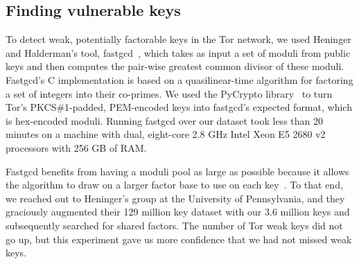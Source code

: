 \subsection{Finding vulnerable keys}
\label{sec:vulnerable-keys}
To detect weak, potentially factorable keys in the Tor network, we used Heninger
and Halderman's tool, fastgcd~\cite{fastgcd}, which takes as input a set
of moduli from public keys and then computes the pair-wise greatest common
divisor of these moduli.  Fastgcd's C implementation is based on a
quasilinear-time algorithm for factoring a set of integers into their co-primes.
We used the PyCrypto library~\cite{pycrypto} to turn Tor's PKCS\#1-padded,
PEM-encoded keys into fastgcd's expected format, which is hex-encoded
moduli.  Running fastgcd over our dataset took less than 20 minutes on
a machine with dual, eight-core 2.8 GHz Intel Xeon E5 2680 v2 processors with
256 GB of RAM.

Fastgcd benefits from having a moduli pool as large as possible
because it allows the algorithm to draw on a larger factor base to use on each
key~\cite{Heninger2012a}.  To that end, we reached out to Heninger's group at
the University of Pennsylvania, and they graciously augmented their 129 million
key dataset with our 3.6 million keys and subsequently searched for shared
factors.  The number of Tor weak keys did not go up, but this experiment gave us
more confidence that we had not missed weak keys.
